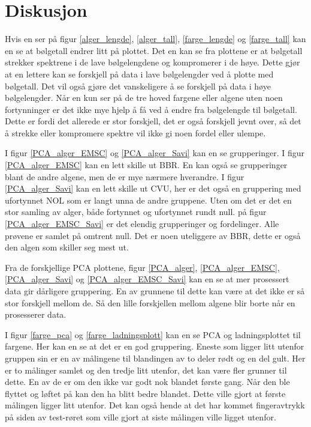 \documentclass[twocolumn, 11pt]{article} %
\begin{document}
\section{Diskusjon}
Hvis en ser på figur \ref{alger_lengde}, \ref{alger_tall}, \ref{farge_lengde} og \ref{farge_tall} kan en se at bølgetall endrer litt på plottet. Det en kan se fra plottene er at bølgetall strekker spektrene i de lave bølgelengdene og kompromerer i de høye. Dette gjør at en lettere kan se forskjell på data i lave bølgelengder ved å plotte med bølgetall. Det vil også gjøre det vanskeligere å se forskjell på data i høye bølgelengder. 
Når en kun ser på de tre hoved fargene eller algene uten noen fortynninger er det ikke mye hjelp å få ved å endre fra bølgelengde til bølgetall. Dette er fordi det allerede er stor forskjell, det er også forskjell jevnt over, så det å strekke eller kompromere spektre vil ikke gi noen fordel eller ulempe.  

\bigskip
I figur \ref{PCA_alger_EMSC} og \ref{PCA_alger_Savi} kan en se grupperinger. I figur \ref{PCA_alger_EMSC} kan en lett skille ut BBR. En kan også se grupperinger blant de andre algene, men de er mye nærmere hverandre. I figur  \ref{PCA_alger_Savi} kan en lett skille ut CVU, her er det også en gruppering med ufortynnet NOL som er langt unna de andre gruppene. Uten om det er det en stor samling av alger, både fortynnet og ufortynnet rundt null.
på figur \ref{PCA_alger_EMSC_Savi} er det elendig grupperinger og fordelinger. Alle prøvene er samlet på omtrent null. Det er noen uteliggere av BBR, dette er også den algen som skiller seg mest ut. 

Fra de forskjellige PCA plottene, figur \ref{PCA_alger}, \ref{PCA_alger_EMSC}, \ref{PCA_alger_Savi} og \ref{PCA_alger_EMSC_Savi} kan en se at mer prosessert data gir dårligere gruppering. En av grunnene til dette kan være at det ikke er så stor forskjell mellom de. Så den lille forskjellen mellom algene blir borte når en prosesserer data. 

\bigskip


I figur \ref{farge_pca} og \ref{farge_ladningsplott} kan en se PCA og ladningsplottet til fargene. Her kan en se at det er en god gruppering. Eneste som ligger litt utenfor gruppen sin er en av målingene til blandingen av to deler rødt og en del gult. Her er to målinger samlet og den tredje litt utenfor, det kan være fler grunner til dette. En av de er om den ikke var godt nok blandet første gang. Når den ble flyttet og løftet på kan den ha blitt bedre blandet. Dette ville gjort at første målingen ligger litt utenfor. Det kan også hende at det har kommet fingeravtrykk på siden av test-røret som ville gjort at siste målingen ville ligget utenfor.
\end{document}
